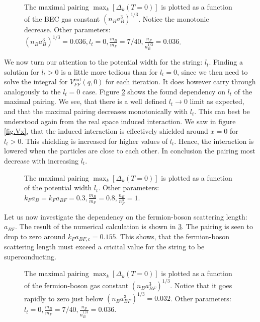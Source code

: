 \begin{figure} 
\begin{center}  
  
\caption{The maximal pairing $\max_k[\Delta_k(T=0)]$ is plotted as a function of the BEC gas constant $(n_Ba_B^3)^{1/3}$. Notice the monotonic decrease. Other parameters: $(n_Ba_B^3)^{1/3} = 0.036, l_t = 0, \frac{m_B}{m_F} = 7/40, \frac{n_F}{n_B^{1/3}} = 0.036$.}  
\label{fig.maxkDeltakaBdepend}  
\end{center}    
\end{figure}


 We now turn our attention to the potential width for the string: $l_t$. Finding a solution for $l_t > 0$ is a little more tedious than for $l_t = 0$, since we then need to solve the integral for $V_{FF}^\text{ind}(q,0)$ for each iteration. It does however carry through analogously to the $l_t = 0$ case. Figure \ref{fig.maxkDeltakltdepend} shows the found dependency on $l_t$ of the maximal pairing. We see, that there is a well defined $l_t \to 0$ limit as expected, and that the maximal pairing decreases monotonically with $l_t$. This can best be understood again from the real space induced interaction. We saw in figure \ref{fig.Vx}, that the induced interaction is effectively shielded around $x = 0$ for $l_t > 0$. This shielding is increased for higher values of $l_t$. Hence, the interaction is lowered when the particles are close to each other. In conclusion the pairing most decrease with increasing $l_t$. 

\begin{figure} 
\begin{center}  
  
\caption{The maximal pairing $\max_k[\Delta_k(T=0)]$ is plotted as a function of the potential width $l_t$. Other parameters: $k_Fa_B = k_F a_{BF} = 0.3, \frac{m_B}{m_F} = 0.8, \frac{n_B}{n_F^3} = 1$.}  
\label{fig.maxkDeltakltdepend}  
\end{center}    
\end{figure}

Let us now investigate the dependency on the fermion-boson scattering length: $a_{BF}$. The result of the numerical calculation is shown in \ref{fig.maxkDeltakaBFdepend}. The pairing is seen to drop to zero around $k_Fa_{BF,c} = 0.155$. This shows, that the fermion-boson scattering length must exceed a cricital value for the string to be superconducting.   

\begin{figure} 
\begin{center}  
  
\caption{The maximal pairing $\max_k[\Delta_k(T=0)]$ is plotted as a function of the fermion-boson gas constant $(n_Ba_{BF}^3)^{1/3}$. Notice that it goes rapidly to zero just below $(n_Ba_{BF}^3)^{1/3}= 0.032$. Other parameters: $l_t = 0, \frac{m_B}{m_F} = 7/40, \frac{n_F}{n_B^{1/3}} = 0.036$.}  
\label{fig.maxkDeltakaBFdepend}  
\end{center}    
\end{figure}

